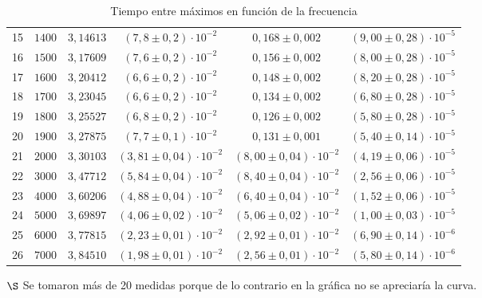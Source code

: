 \documentclass[11pt]{report}
\begin{document}
\begin{refsection}
\begin{table}[H]
\begin{threeparttable}
\begin{tabular}{|c|c|c|c|c|c|}
15 & $1400$ & $3,14613$ & $(7,8 \pm 0,2) \cdot 10^{-2}$ & $0,168 \pm 0,002$ & $(9,00 \pm 0,28) \cdot 10^{-5}$ \\
16 & $1500$ & $3,17609$ & $(7,6 \pm 0,2) \cdot 10^{-2}$ & $0,156 \pm 0,002$ & $(8,00 \pm 0,28) \cdot 10^{-5}$ \\
17 & $1600$ & $3,20412$ & $(6,6 \pm 0,2) \cdot 10^{-2}$ & $0,148 \pm 0,002$ & $(8,20 \pm 0,28) \cdot 10^{-5}$ \\
18 & $1700$ & $3,23045$ & $(6,6 \pm 0,2) \cdot 10^{-2}$ & $0,134 \pm 0,002$ & $(6,80 \pm 0,28) \cdot 10^{-5}$ \\
19 & $1800$ & $3,25527$ & $(6,8 \pm 0,2) \cdot 10^{-2}$ & $0,126 \pm 0,002$ & $(5,80 \pm 0,28) \cdot 10^{-5}$ \\
20 & $1900$ & $3,27875$ & $(7,7 \pm 0,1) \cdot 10^{-2}$ & $0,131 \pm 0,001$ & $(5,40 \pm 0,14) \cdot 10^{-5}$ \\
21 & $2000$ & $3,30103$ & $(3,81 \pm 0,04) \cdot 10^{-2}$ & $(8,00 \pm 0,04) \cdot 10^{-2}$ & $(4,19 \pm 0,06) \cdot 10^{-5}$ \\
22 & $3000$ & $3,47712$ & $(5,84 \pm 0,04) \cdot 10^{-2}$ & $(8,40 \pm 0,04) \cdot 10^{-2}$ & $(2,56 \pm 0,06) \cdot 10^{-5}$ \\
23 & $4000$ & $3,60206$ & $(4,88 \pm 0,04) \cdot 10^{-2}$ & $(6,40 \pm 0,04) \cdot 10^{-2}$ & $(1,52 \pm 0,06) \cdot 10^{-5}$ \\
24 & $5000$ & $3,69897$ & $(4,06 \pm 0,02) \cdot 10^{-2}$ & $(5,06 \pm 0,02) \cdot 10^{-2}$ & $(1,00 \pm 0,03) \cdot 10^{-5}$ \\
25 & $6000$ & $3,77815$ & $(2,23 \pm 0,01) \cdot 10^{-2}$ & $(2,92 \pm 0,01) \cdot 10^{-2}$ & $(6,90 \pm 0,14) \cdot 10^{-6}$ \\
26 & $7000$ & $3,84510$ & $(1,98 \pm 0,01) \cdot 10^{-2}$ & $(2,56 \pm 0,01) \cdot 10^{-2}$ & $(5,80 \pm 0,14) \cdot 10^{-6}$ \\
\hline
\end{tabular}
\begin{tablenotes}
\item[$\S$] Se tomaron más de 20 medidas porque de lo contrario en la gráfica no se apreciaría la curva.
\end{tablenotes}
\end{threeparttable}
\caption{Tiempo entre máximos en función de la frecuencia}
\label{tab:tiempos}
\end{table}


\end{refsection}
\end{document}
